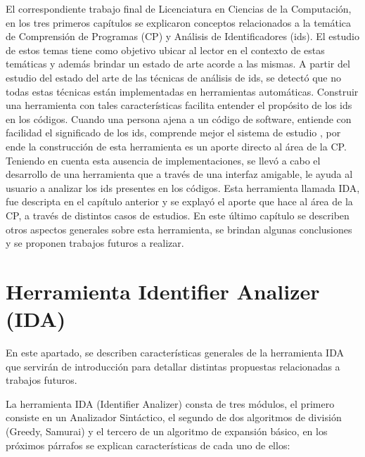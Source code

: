\fancyhf{}
\pagestyle{fancy}
\lhead[]{\leftmark}
\chead[]{}
\rhead[]{\thepage}
\renewcommand{\headrulewidth}{1pt}

El correspondiente trabajo final de Licenciatura en Ciencias de la Computación, en los tres primeros capítulos se explicaron conceptos relacionados a la temática de Comprensión de Programas (CP) y Análisis de Identificadores (ids). El estudio de estos temas tiene como objetivo ubicar al lector en el contexto de estas temáticas y además brindar un estado de arte acorde a las mismas. 
A partir del estudio del estado del arte de las técnicas de análisis de ids, se detectó que no todas estas técnicas están implementadas en herramientas automáticas. Construir una herramienta con tales características facilita entender el propósito de los ids en los códigos. Cuando una persona ajena a un código de software, entiende con facilidad el significado de los ids, comprende mejor el sistema de estudio \cite{EZH08,DFPM05,BCPT00,DMDJ13}, por ende la construcción de esta herramienta es un aporte directo al área de la CP. Teniendo en cuenta esta ausencia de implementaciones, se llevó a cabo el desarrollo de una herramienta que a través de una interfaz amigable, le ayuda al usuario a analizar los ids presentes en los códigos. Esta herramienta llamada IDA, fue descripta en el capítulo anterior y se explayó el aporte que hace al área de la CP, a través de distintos casos de estudios. En este último capítulo se describen otros aspectos generales sobre esta herramienta, se brindan algunas conclusiones y se proponen trabajos futuros a realizar.

\section{Herramienta Identifier Analizer (IDA)} 

En este apartado, se describen características generales de la herramienta IDA que servirán de introducción para detallar distintas propuestas relacionadas a trabajos futuros.

La herramienta IDA (Identifier Analizer) consta de tres módulos, el primero consiste en un Analizador Sintáctico, el segundo de dos algoritmos de división (Greedy, Samurai) y el tercero de un algoritmo de expansión básico, en los próximos párrafos se explican características de cada uno de ellos:

